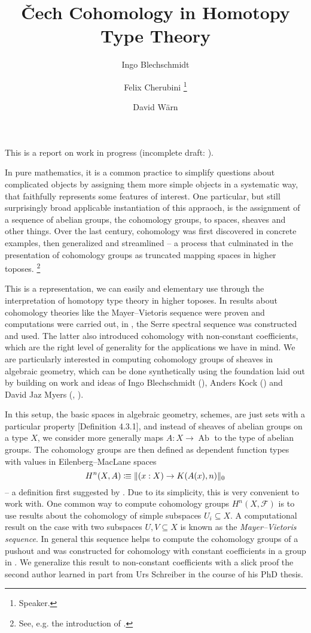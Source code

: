 \documentclass[letterpaper]{../util/easychair}
\title{\v{C}ech Cohomology in Homotopy Type Theory
}
\author{
Ingo Blechschmidt \inst{1}
\and 
 Felix Cherubini \inst{2}
 \thanks{Speaker.}
\and 
 David Wärn \inst{3}
}
\institute{
  \email{iblech@speicherleck.de}
\and
  University of Gothenburg\\
  \email{felix.cherubini@posteo.de}
\and
  University of Gothenburg\\
  \email{warnd@chalmers.se}
}
\DeclareMathOperator{\AbGroup}{Ab}
\newcommand{\notion}[1]{\emph{#1}\index{#1}}
\providecommand*\colonequiv{\vcentcolon\mspace{-1.2mu}\equiv}
\begin{document}
\maketitle

This is a report on work in progress (incomplete draft: \cite{chech-draft}).

In pure mathematics,
it is a common practice to simplify questions about complicated objects
by assigning them more simple objects in a systematic way,
that faithfully represents some features of interest.
One particular, but still surprisingly broad applicable instantiation of this appraoch,
is the assignment of a sequence of abelian groups, the cohomology groups, to spaces, sheaves and other things.
Over the last century, cohomology was first discovered in concrete examples, then generalized and streamlined --
a process that culminated in the presentation of cohomology groups as truncated mapping spaces in higher toposes.
\footnote{See, e.g. the introduction of \cite{lurie-htt}.}

This is a representation, we can easily and elementary use through the interpretation of homotopy type theory in higher toposes.
In \cite{evan-master-thesis} results about cohomology theories like the Mayer--Vietoris sequence were proven and computations were carried out,
in \cite{floris-thesis}, the Serre spectral sequence was constructed and used.
The latter also introduced cohomology with non-constant coefficients,
which are the right level of generality for the applications we have in mind.
We are particularly interested in computing cohomology groups of sheaves in algebraic geometry,
which can be done synthetically using the foundation laid out by \cite{draft}
building on work and ideas of Ingo Blechschmidt (\cite{ingo-thesis}), Anders Kock (\cite{kock-sdg})
and David Jaz Myers (\cite{myers-talk1}, \cite{myers-talk2}).

In this setup, the basic spaces in algebraic geometry, schemes,
are just sets with a particular property \cite{draft}[Definition 4.3.1],
and instead of sheaves of abelian groups on a type $X$,
we consider more generally maps $A:X\to\AbGroup$ to the type of abelian groups.
The cohomology groups are then defined as dependent function types with values in Eilenberg--MacLane spaces
\[ H^n(X,A)\colonequiv \|(x:X)\to K(A(x),n)\|_0\]
-- a definition first suggested by \cite{mike-blogpost}.
Due to its simplicity, this is very convenient to work with.
One common way to compute cohomology groups $H^n(X,\mathcal F)$ is to
use results about the cohomology of simple subspaces $U_i\subseteq X$.
A computational result on the case with two subspaces $U,V\subseteq X$ is known as the \notion{Mayer--Vietoris sequence}.
In general this sequence helps to compute the cohomology groups of a pushout
and was constructed for cohomology with constant coefficients in a group in \cite{evan-master-thesis}.
We generalize this result to non-constant coefficients
with a slick proof the second author learned in part from Urs Schreiber in the course of his PhD thesis.
\end{document}
